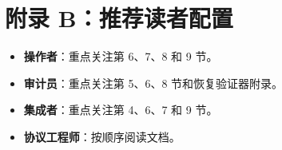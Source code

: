 \documentclass[11pt]{article}
\begin{document}
\section{附录 B：推荐读者配置}
\begin{itemize}
  \item \textbf{操作者}：重点关注第 6、7、8 和 9 节。
  \item \textbf{审计员}：重点关注第 5、6、8 节和恢复验证器附录。
  \item \textbf{集成者}：重点关注第 4、6、7 和 9 节。
  \item \textbf{协议工程师}：按顺序阅读文档。
\end{itemize}
\end{document}
